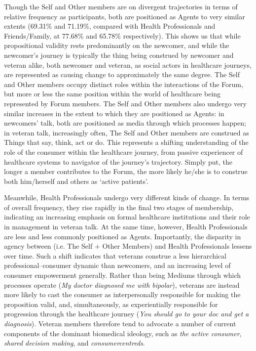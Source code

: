 Though the Self and Other \Glspl{member} are on divergent trajectories in terms of relative frequency as participants, both are positioned as Agents to very similar extents (69.31\% and 71.19\%, compared with Health Professionals and Friends\slash Family, at 77.68\% and 65.78\% respectively). This shows us that while propositional validity rests predominantly on the newcomer, and while the newcomer's journey is typically the thing being construed by newcomer and veteran alike, both newcomer and veteran, as social actors in healthcare journeys, are represented as causing change to approximately the same degree. The Self and Other \Glspl{member} occupy distinct roles within the interactions of the \gls{Forum}, but more or less the same position within the world of healthcare being represented by \gls{Forum} \glspl{member}. The Self and Other \glspl{member} also undergo very similar increases in the extent to which they are positioned as Agents: in newcomers' talk, both are positioned as media through which processes happen; in veteran talk, increasingly often, The Self and Other \glspl{member} are construed as Things that say, think, act or do. This represents a shifting understanding of the role of the \gls{consumer} within the healthcare journey, from passive experiencer of healthcare systems to navigator of the journey's trajectory. Simply put, the longer a member contributes to the \gls{Forum}, the more likely he\slash she is to construe both him\slash herself and others as `active patients'.

Meanwhile, Health Professionals undergo very different kinds of change. In terms of overall frequency, they rise rapidly in the final two stages of membership, indicating an increasing emphasis on formal healthcare institutions and their role in  management in veteran talk. At the same time, however, Health Professionals are less and less commonly positioned as Agents. Importantly, the disparity in agency between  (i.e. The Self $+$ Other Members) and Health Professionals lessens over time. Such a shift indicates that veterans construe a less hierarchical professional--\gls{consumer} dynamic than newcomers, and an increasing level of \gls{consumer} empowerment generally. Rather than being Mediums through which processes operate (\emph{My doctor diagnosed me with bipolar}), veterans are instead more likely to cast the \gls{consumer} as interpersonally responsible for making the proposition valid, and, simultaneously, as experientially responsible for progression through the healthcare journey (\emph{You should go to your doc and get a diagnosis}). Veteran \glspl{member} therefore tend to advocate a number of current components of the dominant biomedical ideology, such as \emph{the active \gls{consumer}}, \emph{shared decision making}, and \emph{\glspl{consumercentred}}. %

